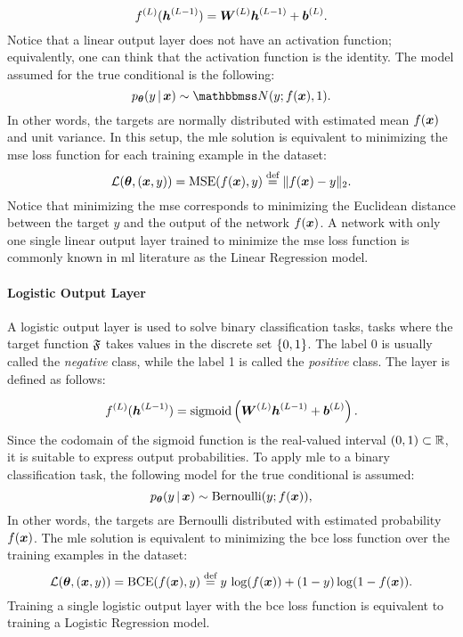 $$\Layer{f}{L}(\LayerVector{h}{L-1}) = \LayerMatrix{W}{L} \LayerVector{h}{L-1} + \LayerVector{b}{L}.$$
Notice that a linear output layer does not have an activation function; equivalently, one can think that the activation function is the identity. The model assumed for the true conditional is the following:
$$p_{\Param}(y \given \Vector{x}) \sim \Normal{y; f(\Vector{x})}{1}.$$
In other words, the targets are normally distributed with estimated mean $f(\Vector{x})$ and unit variance. In this setup, the \gls{mle} solution is equivalent to minimizing the \gls{mse} loss function for each training example in the dataset:
$$\Loss(\Param, (\Vector{x}, y)) =\Fun{MSE}(f(\Vector{x}), y) \defeq \norm{ f(\Vector{x}) - y}_2.$$
Notice that minimizing the \gls{mse} corresponds to minimizing the Euclidean distance between the target $y$ and the output of the network $f(\Vector{x})$. A network with only one single linear output layer trained to minimize the \gls{mse} loss function is commonly known in \gls{ml} literature as the Linear Regression model.

\paragraph{Logistic Output Layer}
A logistic output layer is used to solve binary classification tasks, \ie tasks where the target function $\mathfrak{F}$ takes values in the discrete set $\left\{ 0, 1 \right\}$. The label 0 is usually called the \emph{negative} class, while the label 1 is called the \emph{positive} class. The layer is defined as follows:

$$\Layer{f}{L}(\LayerVector{h}{L-1}) = \sigmoid \Par{\LayerMatrix{W}{L} \LayerVector{h}{L-1} + \LayerVector{b}{L}}.$$
Since the codomain of the sigmoid function is the real-valued interval $(0, 1) \subset \mathbb{R}$, it is suitable to express output probabilities. To apply \gls{mle} to a binary classification task, the following model for the true conditional is assumed:
$$p_{\Param}(y \given \Vector{x}) \sim \Fun{Bernoulli}(y; f(\Vector{x})),$$
In other words, the targets are Bernoulli distributed with estimated probability $f(\Vector{x})$. The \gls{mle} solution is equivalent to minimizing the \gls{bce} loss function over the training examples in the dataset:
$$\Loss(\Param, (\Vector{x}, y)) = \Fun{BCE}(f(\Vector{x}),y) \defeq y\, \log( f(\Vector{x})) + ( 1 - y) \log(1 -  f(\Vector{x})).$$
Training a single logistic output layer with the \gls{bce} loss function is equivalent to training a Logistic Regression model.

